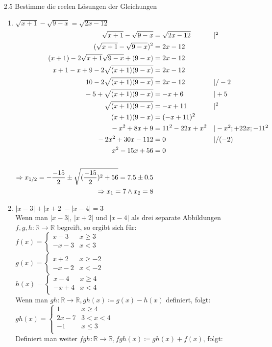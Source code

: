 \documentclass[12pt,letterpaper]{article}
\newcommand{\alignleft}[1]{\tag*{\llap{\makebox[\linewidth][l]{$#1$}}}}
\newcommand{\LLeftrightarrow}{ \alignleft{\Leftrightarrow}}
\newcommand{\eqinfo}[1]{&\makebox[2cm][l]{$\vert #1$}}
\newcommand{\Eqn}[3]{#1 &#2 #3}
\newcommand{\eqn}[2]{\LLeftrightarrow\Eqn{#1}{=}{#2}\\}
\newcommand{\eqni}[3]{\LLeftrightarrow\Eqn{#1}{=}{#2}\eqinfo{#3}\\}
\newcommand{\eqnfi}[3]{\Eqn{#1}{=}{#2}\eqinfo{#3}\\}
\begin{document}
\begin{enumerate}
\item [2.5] Bestimme die reelen Lösungen der Gleichungen
\begin{enumerate}
\item $\sqrt{x+1}-\sqrt{9-x}=\sqrt{2x-12}$\\
\begin{align*}
\eqnfi{\sqrt{x+1}-\sqrt{9-x}}{\sqrt{2x-12}}{^2}
\eqn{(\sqrt{x+1}-\sqrt{9-x})^2}{2x-12}
\eqn{(x+1)-2\sqrt{x+1}\sqrt{9-x}+(9-x)}{2x-12}
\eqn{x+1-x+9-2\sqrt{(x+1)(9-x)}}{2x-12}
\eqni{10-2\sqrt{(x+1)(9-x)}}{2x-12}{/-2}
\eqni{-5+\sqrt{(x+1)(9-x)}}{-x+6}{+5}
\eqni{\sqrt{(x+1)(9-x)}}{-x+11}{^2}
\eqn{(x+1)(9-x)}{(-x+11)^2}
\eqni{-x^2+8x+9}{11^2-22x+x^2}{-x^2; +22x; -11^2}
\eqni{-2x^2+30x-112}{0}{/(-2)}
\eqn{x^2-15x+56}{0}
\\
\Rightarrow x_{1/2} = -\frac{-15}{2}\pm\sqrt{(\frac{-15}{2})^2+56}
= 7.5\pm 0.5\\
\Rightarrow x_1=7 \land x_2=8
\end{align*}
\item $|x-3|+|x+2|-|x-4|=3$\\
Wenn man $|x-3|$, $|x+2|$ und $|x-4|$ als drei separate Abbildungen $f,g,h:\mathbb{R}\to\mathbb{R}$ begreift, so ergibt sich für:\\
$f(x) = \begin{cases}
x-3 &x\geq 3\\
-x-3 &x<3\\
\end{cases}$\\
$g(x) = \begin{cases}
x+2 &x\geq -2\\
-x-2 &x<-2
\end{cases}$\\
$h(x) = \begin{cases}
x-4 &x\geq 4\\
-x+4 &x<4\\
\end{cases}$\\
Wenn man $gh:\mathbb{R}\to\mathbb{R}, gh(x)\coloneqq g(x)-h(x)$ definiert, folgt:\\
$gh(x) = \begin{cases}
1 &x\geq 4\\
2x-7 &3<x<4\\
-1 &x\leq3\\
\end{cases}$\\
\newpage
Definiert man weiter $fgh:\mathbb{R}\to\mathbb{R}, fgh(x)\coloneqq gh(x)+f(x)$, folgt:\\

\end{enumerate}
\end{enumerate}
\end{document}
